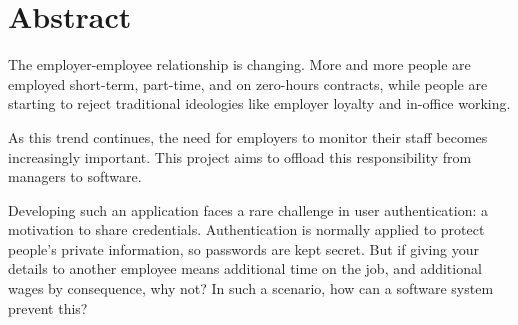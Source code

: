 \chapter*{Abstract}

The employer-employee relationship is changing.
More and more people are employed short-term, part-time,
and on zero-hours contracts, while people are starting to
reject traditional ideologies like employer loyalty and
in-office working.

As this trend continues, the need for employers to monitor
their staff becomes increasingly important.
This project aims to offload this responsibility from
managers to software.

Developing such an application faces a rare challenge in
user authentication: a motivation to share credentials.
Authentication is normally applied to protect people's
private information, so passwords are kept secret.
But if giving your details to another employee means
additional time on the job, and additional wages by
consequence, why not?
In such a scenario, how can a software system prevent this?

